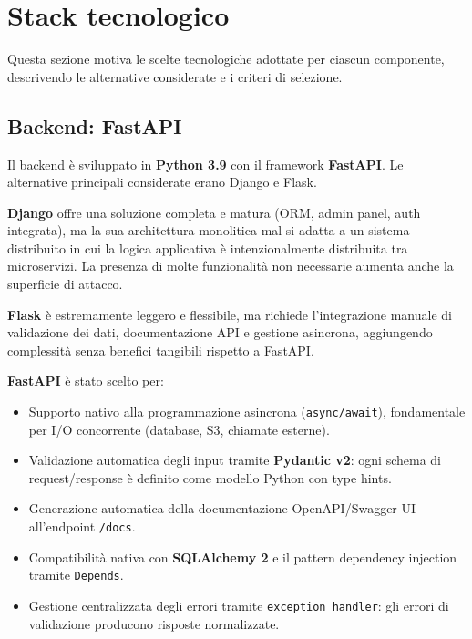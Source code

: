 \chapter{Stack tecnologico}
\label{chap:stack}

Questa sezione motiva le scelte tecnologiche adottate per ciascun componente, descrivendo
le alternative considerate e i criteri di selezione.

\section{Backend: FastAPI}
\label{sec:stack_backend}

Il backend \`e sviluppato in \textbf{Python 3.9} con il framework \textbf{FastAPI}. Le
alternative principali considerate erano Django e Flask.

\textbf{Django} offre una soluzione completa e matura (ORM, admin panel, auth integrata),
ma la sua architettura monolitica mal si adatta a un sistema distribuito in cui la logica
applicativa \`e intenzionalmente distribuita tra microservizi. La presenza di molte
funzionalit\`a non necessarie aumenta anche la superficie di attacco.

\textbf{Flask} \`e estremamente leggero e flessibile, ma richiede l'integrazione manuale
di validazione dei dati, documentazione API e gestione asincrona, aggiungendo complessit\`a
senza benefici tangibili rispetto a FastAPI.

\textbf{FastAPI} \`e stato scelto per:
\begin{itemize}[leftmargin=*]
    \item Supporto nativo alla programmazione asincrona (\texttt{async/await}),
          fondamentale per I/O concorrente (database, S3, chiamate esterne).
    \item Validazione automatica degli input tramite \textbf{Pydantic v2}: ogni
          schema di request/response \`e definito come modello Python con type hints.
    \item Generazione automatica della documentazione OpenAPI/Swagger UI
          all'endpoint \texttt{/docs}.
    \item Compatibilit\`a nativa con \textbf{SQLAlchemy 2} e il pattern
          dependency injection tramite \texttt{Depends}.
    \item Gestione centralizzata degli errori tramite \texttt{exception\_handler}:
          gli errori di validazione producono risposte normalizzate.
\end{itemize}

